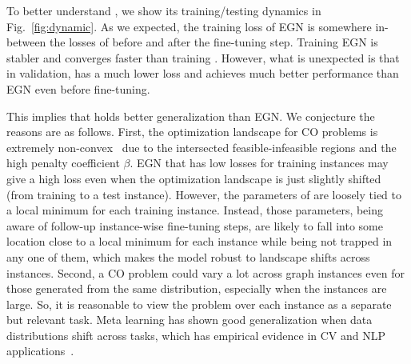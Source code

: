 


To better understand \proj, we show its training/testing dynamics in Fig.~\ref{fig:dynamic}. As we expected, the training loss of EGN is somewhere in-between the losses of \proj before and after the fine-tuning step. Training EGN is stabler and converges faster than training \proj. However, what is unexpected is that in validation, \proj has a much lower loss and achieves much better performance than EGN even before fine-tuning. 

This implies that \proj holds better generalization than EGN. We conjecture the reasons are as follows. First, the optimization landscape for CO problems is extremely non-convex~\citep{mezard2009information} due to the intersected feasible-infeasible regions and the high penalty coefficient $\beta$. 
EGN that has low losses for training instances may give a high loss even when the optimization landscape is just slightly shifted (from training to a test instance). However, the parameters of \proj are loosely tied to a local minimum for each training instance. Instead, those parameters, being aware of follow-up instance-wise fine-tuning steps, are likely to fall into some location close to a local minimum for each instance while being not trapped in any one of them, which makes the model robust to landscape shifts across instances. Second, a CO problem could vary a lot across graph instances even for those generated from the same distribution, especially when the instances are large. So, it is reasonable to view the problem over each instance as a separate but relevant task. %
Meta learning has shown good generalization when data distributions shift across tasks, which has empirical evidence in CV and NLP applications~\citep{jeong2020ood,conklin2021meta}.

